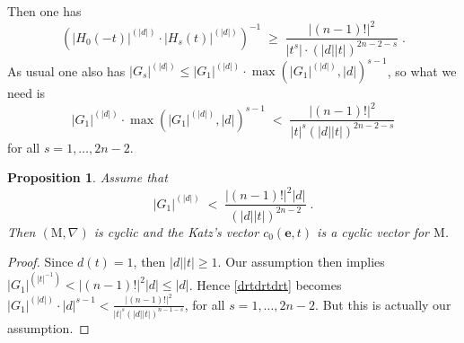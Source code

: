 \documentclass{compositio}
\newtheorem{proposition}[theorem]{Proposition}
\numberwithin{equation}{section}
\begin{document}
Then one has
\begin{equation}
(|H_0(-t)|^{(|d|)}\cdot|H_s(t)|^{(|d|)})^{-1}\;\geq\; \frac{|(n-1)!|^2}{|t^s|\cdot(|d||t|)^{2n-2-s}}\;.
\end{equation}
As usual one also has $|G_s|^{(|d|)}\leq|G_1|^{(|d|)}\cdot\max(|G_1|^{(|d|)},|d|)^{s-1}$, 
so what we need is
\begin{equation}\label{drtdrtdrt}
|G_1|^{(|d|)}\cdot\max(|G_1|^{(|d|)},|d|)^{s-1} \; < \;\frac{|(n-1)!|^2}{|t|^s(|d||t|)^{2n-2-s}}
\end{equation}
for all $s=1,\ldots,2n-2$. 
\begin{proposition}
Assume that
\begin{equation}
|G_1|^{(|d|)}\;<\;\frac{|(n-1)!|^2|d|}{(|d||t|)^{2n-2}}\;.
\end{equation}
Then $({\mathrm{M}},\nabla)$ is cyclic and the Katz's vector $c_0({\mathbf{e}},t)$ is a cyclic vector for ${\mathrm{M}}$.
\end{proposition}
\begin{proof}
Since $d(t)=1$, then $|d||t|\geq 1$. Our assumption then implies $|G_1|^{(|t|^{-1})}<|(n-1)!|^2|d|\leq|d|$. Hence 
\eqref{drtdrtdrt} becomes $|G_1|^{(|d|)}\cdot|d|^{s-1}<\frac{|(n-1)!|^2}{|t|^{s}(|d||t|)^{n-1-s}}$, for all 
$s=1,\ldots,2n-2$. But this is actually our assumption.
\end{proof}
\end{document}
